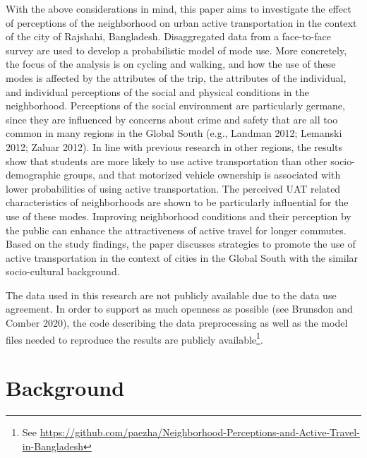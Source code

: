 \documentclass[]{elsarticle} %
\begin{document}
With the above considerations in mind, this paper aims to investigate
the effect of perceptions of the neighborhood on urban active
transportation in the context of the city of Rajshahi, Bangladesh.
Disaggregated data from a face-to-face survey are used to develop a
probabilistic model of mode use. More concretely, the focus of the
analysis is on cycling and walking, and how the use of these modes is
affected by the attributes of the trip, the attributes of the
individual, and individual perceptions of the social and physical
conditions in the neighborhood. Perceptions of the social environment
are particularly germane, since they are influenced by concerns about
crime and safety that are all too common in many regions in the Global
South (e.g., Landman 2012; Lemanski 2012; Zaluar 2012). In line with
previous research in other regions, the results show that students are
more likely to use active transportation than other socio-demographic
groups, and that motorized vehicle ownership is associated with lower
probabilities of using active transportation. The perceived UAT related
characteristics of neighborhoods are shown to be particularly
influential for the use of these modes. Improving neighborhood
conditions and their perception by the public can enhance the
attractiveness of active travel for longer commutes. Based on the study
findings, the paper discusses strategies to promote the use of active
transportation in the context of cities in the Global South with the
similar socio-cultural background.

The data used in this research are not publicly available due to the
data use agreement. In order to support as much openness as possible
(see Brunsdon and Comber 2020), the code describing the data
preprocessing as well as the model files needed to reproduce the results
are publicly
available\footnote{See \url{https://github.com/paezha/Neighborhood-Perceptions-and-Active-Travel-in-Bangladesh}}.

\hypertarget{background}{%
\section{Background}\label{background}}
\end{document}
